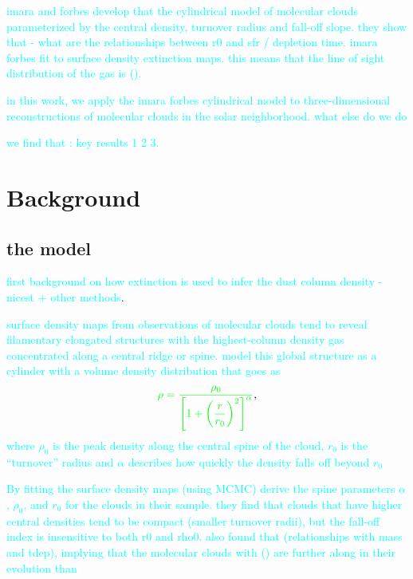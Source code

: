 \documentclass[twocolumn]{aastex631}
\begin{document}
\textcolor{cyan}{imara and forbes develop that the cylindrical model of molecular clouds parameterized by the central density, turnover radius and fall-off slope. they show that - what are the relationships between r0 and sfr / depletion time. imara forbes fit to surface density extinction maps. this means that the line of sight distribution of the gas is (). }

\textcolor{cyan}{in this work, we apply the imara forbes cylindrical model to three-dimensional reconstructions of molecular clouds in the solar neighborhood. what else do we do }

\textcolor{cyan}{we find that : key results 1 2 3.}

\section{Background}\label{sec:model}
\subsection{the model}
\textcolor{cyan}{first background on how extinction is used to infer the dust column density - nicest + other methods}.



\textcolor{cyan}{surface density maps from observations of molecular clouds tend to reveal filamentary elongated structures with the highest-column density gas concentrated along a central ridge or spine. \citet{ImaraForbes_2023} model this global structure as a cylinder with a volume density distribution that goes as 
\begin{align}\label{eq:rho}
\textcolor{green}{\rho = \frac{\rho_0}{\left[1 + \left(\dfrac{r}{r_0}\right)^2\right]^{\alpha}}},
\end{align}
where $\rho_0$ is the peak density along the central spine of the cloud, $r_0$ is the ``turnover'' radius and $\alpha$ describes how quickly the density falls off beyond $r_0$}

\textcolor{cyan}{By fitting the surface density maps (using MCMC) \citet{ImaraForbes_2023} derive the spine parameters $\alpha$, $\rho_0$, and $r_0$ for the clouds in their sample. they find that clouds that have higher central densities tend to be compact (smaller turnover radii), but the fall-off index is insensitive to both r0 and rho0. \citet{ImaraForbes_2023} also found that (relationships with mass and tdep), implying that the  molecular clouds with () are further along in their evolution than }
\end{document}
